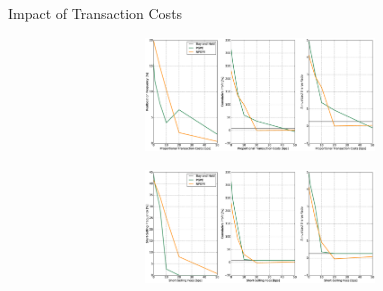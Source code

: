 \begin{frame}[c]{Impact of Transaction Costs}
\begin{figure}[t!]
	\centering
	\includegraphics[height=3cm,width=1.0\textwidth]{Images/6_2_impact_transaction_costs}
\end{figure}
\begin{figure}[t!]
	\centering
	\includegraphics[height=3cm,width=1.0\textwidth]{Images/6_3_impact_short_selling_fees}
\end{figure}
\end{frame}


